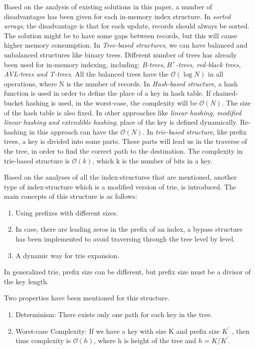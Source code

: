 \documentclass{report}
\begin{document}
Based on the analysis of existing solutions in this paper, a number of disadvantages has been given for each in-memory index structure. In \textit {sorted arrays}, the disadvantage is that for each update, records should always be sorted. The solution might be to have some gaps between records, but this will cause higher memory consumption. In \textit {Tree-based structures}, we can have balanced and unbalanced structures like binary trees. Different number of trees has already been used for in-memory indexing, including: \textit {B-trees,$\ B^+$-trees, red-black trees, AVL-trees and T-trees.} All the balanced trees have the $\mathcal{O}(\log{}N)$ in all operations, where N is the number of records. In \textit{Hash-based structure}, a hash function is used in order to define the place of a key in hash table. If chained-bucket hashing is used, in the worst-case, the complexity will be $\mathcal{O}(N)$. The size of the hash table is also fixed. In other approaches like \textit {linear hashing, modified linear hashing and extendible hashing}, place of the key is defined dynamically. Re-hashing in this approach can have the $\mathcal{O}(N)$. In \textit{trie-based structure}, like prefix trees, a key is divided into some parts. These parts will lead us in the traverse of the tree, in order to find the correct path to the destination. The complexity in trie-based structure is $\mathcal{O}(k)$, which k is the number of bits in a key.

Based on the analyses of all the index-structures that are mentioned, another type of index-structure which is a modified version of trie, is introduced. The main concepts of this structure is as follows: 

\begin{enumerate}
\item Using prefixes with different sizes.
\item In case, there are leading zeros in the prefix of an index, a bypass structure has been implemented to avoid traversing through the tree level by level.
\item A dynamic way for trie expansion.
\end{enumerate}

In generalized trie, prefix size can be different, but prefix size must be a divisor of the key length.

Two properties have been mentioned for this structure.
\begin{enumerate}
\item Determinism: There exists only one path for each key in the tree.
\item Worst-case Complexity: If we have a key with size K and prefix size $K^{\prime}$ , then time complexity is $\mathcal{O}(h)$, where h is height of the tree and $h=K/K^{\prime}$. 
\end{enumerate}
\end{document}
